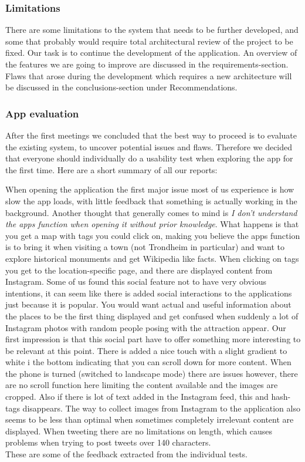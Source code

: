 		\subsubsection{Limitations}
There are some limitations to the system that needs to be further developed, and some that probably would require total architectural review of the project to be fixed. Our task is to continue the development of the application. An overview of the features we are going to improve are discussed in the requirements-section. Flaws that arose during the development which requires a new architecture will be discussed in the conclusions-section under Recommendations.

		\subsubsection{App evaluation}
		
After the first meetings we concluded that the best way to proceed is to evaluate the existing system, to uncover potential issues and flaws.
Therefore we decided that everyone should individually do a usability test when exploring the app for the first time. Here are a short summary of all our reports:

When opening the application the first major issue most of us experience is how slow the app loads, with little feedback that something is actually working in the background. Another thought that generally comes to mind is \emph{I don't understand the apps function when opening it without prior knowledge}. What happens is that you get a map with tags you could click on, making you believe the apps function is to bring it when visiting a town (not Trondheim in particular) and want to explore historical monuments and get Wikipedia like facts. When clicking on tags you get to the location-specific page, and there are displayed content from Instagram. Some of us found this social feature not to have very obvious intentions, it can seem like there is added social interactions to the applications just because it is popular. You would want actual and useful information about the places to be the first thing displayed and get confused when suddenly a lot of Instagram photos with random people posing with the attraction appear. Our first impression is that this social part have to offer something more interesting to be relevant at this point. There is added a nice touch with a slight gradient to white i the bottom indicating that you can scroll down for more content. When the phone is turned (switched to landscape mode) there are issues however, there are no scroll function here limiting the content available and the images are cropped. Also if there is lot of text added in the Instagram feed, this and hash-tags disappears. The way to collect images from Instagram to the application also seems to be less than optimal when sometimes completely irrelevant content are displayed. When tweeting there are no limitations on length, which causes problems when trying to post tweets over 140 characters.\\
These are some of the feedback extracted from the individual tests. 

